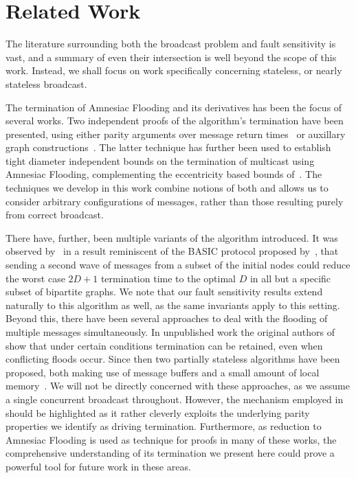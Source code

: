 
\section{Related Work}
The literature surrounding both the broadcast problem and fault sensitivity is vast, and a summary of even their intersection is well beyond the scope of this work. Instead, we shall focus on work specifically concerning stateless, or nearly stateless broadcast.

The termination of Amnesiac Flooding and its derivatives has been the focus of several works. Two independent proofs of the algorithm's termination have been presented, using either parity arguments over message return times~\cite{hussak2023termination} or auxillary graph constructions~\cite{turau2021amnesiac}. The latter technique has further been used to establish tight diameter independent bounds on the termination of multicast using Amnesiac Flooding, complementing the eccentricity based bounds of~\cite{hussak2023termination}. The techniques we develop in this work combine notions of both and allows us to consider arbitrary configurations of messages, rather than those resulting purely from correct broadcast. 

There have, further, been multiple variants of the algorithm introduced. It was observed by~\cite{turau2020stateless} in a result reminiscent of the BASIC protocol proposed by~\cite{gopal1999fast}, that sending a second wave of messages from a subset of the initial nodes could reduce the worst case $2D+1$ termination time to the optimal $D$ in all but a specific subset of bipartite graphs. We note that our fault sensitivity results extend naturally to this algorithm as well, as the same invariants apply to this setting. Beyond this, there have been several approaches to deal with the flooding of multiple messages simultaneously. In unpublished work the original authors of~\cite{hussak2023termination} show that under certain conditions termination can be retained, even when conflicting floods occur. Since then two partially stateless algorithms have been proposed, both making use of message buffers and a small amount of local memory~\cite{turau2021synchronous, bayramzadeh2021weak}. We will not be directly concerned with these approaches, as we assume a single concurrent broadcast throughout. However, the mechanism employed in~\cite{turau2021synchronous} should be highlighted as it rather cleverly exploits the underlying parity properties we identify as driving termination. Furthermore, as reduction to Amnesiac Flooding is used as technique for proofs in many of these works, the comprehensive understanding of its termination we present here could prove a powerful tool for future work in these areas.

